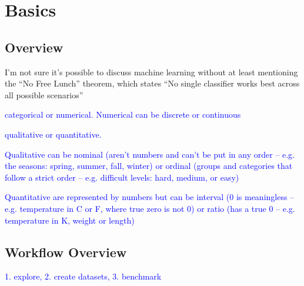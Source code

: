 \chapter{Basics}

\section{Overview}

I'm not sure it's possible to discuss machine learning without at least mentioning the ``No Free Lunch'' theorem, which states ``No single classifier works best across all possible scenarios''

\textcolor{blue}{categorical or numerical. Numerical can be discrete or continuous}

\textcolor{blue}{qualitative or quantitative.} 

\textcolor{blue}{Qualitative can be nominal (aren't numbers and can't be put in any order -- e.g. the seasons: spring, summer, fall, winter) or ordinal (groups and categories that follow a strict order -- e.g. difficult levels: hard, medium, or easy)}

\textcolor{blue}{Quantitative are represented by numbers but can be interval (0 is meaningless -- e.g. temperature in C or F, where true zero is not 0) or ratio (has a true 0 -- e.g. temperature in K, weight or length)}

\section{Workflow Overview}

\textcolor{blue}{1. explore, 2. create datasets, 3. benchmark}














